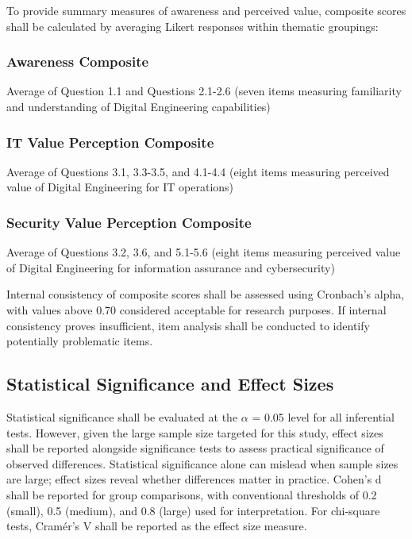 To provide summary measures of awareness and perceived value, composite scores shall be calculated by averaging Likert responses within thematic groupings:

\subsubsection{Awareness Composite}

Average of Question 1.1 and Questions 2.1-2.6 (seven items measuring familiarity and understanding of Digital Engineering capabilities)

\subsubsection{IT Value Perception Composite}

Average of Questions 3.1, 3.3-3.5, and 4.1-4.4 (eight items measuring perceived value of Digital Engineering for IT operations)

\subsubsection{Security Value Perception Composite}

Average of Questions 3.2, 3.6, and 5.1-5.6 (eight items measuring perceived value of Digital Engineering for information assurance and cybersecurity)

Internal consistency of composite scores shall be assessed using Cronbach's alpha, with values above 0.70 considered acceptable for research purposes. If internal consistency proves insufficient, item analysis shall be conducted to identify potentially problematic items.

\subsection{Statistical Significance and Effect Sizes}

Statistical significance shall be evaluated at the \(\alpha\) = 0.05 level for all inferential tests. However, given the large sample size targeted for this study, effect sizes shall be reported alongside significance tests to assess practical significance of observed differences. Statistical significance alone can mislead when sample sizes are large; effect sizes reveal whether differences matter in practice. Cohen's d shall be reported for group comparisons, with conventional thresholds of 0.2 (small), 0.5 (medium), and 0.8 (large) used for interpretation. For chi-square tests, Cram\'{e}r's V shall be reported as the effect size measure.

